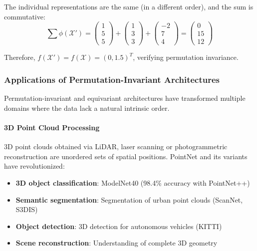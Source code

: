 \begin{example}
The individual representations are the same (in a different order), and the sum is commutative:
\begin{equation}
\sum \phi(\mathcal{X}') = \begin{pmatrix} 1 \\ 5 \\ 5 \end{pmatrix} + \begin{pmatrix} 1 \\ 3 \\ 3 \end{pmatrix} + \begin{pmatrix} -2 \\ 7 \\ 4 \end{pmatrix} = \begin{pmatrix} 0 \\ 15 \\ 12 \end{pmatrix}
\end{equation}

Therefore, $f(\mathcal{X}') = f(\mathcal{X}) = (0, 1.5)^T$, verifying permutation invariance.
\end{example}

\subsubsection{Applications of Permutation-Invariant Architectures}

Permutation-invariant and equivariant architectures have transformed multiple domains where the data lack a natural intrinsic order.

\paragraph{3D Point Cloud Processing}

3D point clouds obtained via LiDAR, laser scanning or photogrammetric reconstruction are unordered sets of spatial positions. PointNet and its variants have revolutionized:

\begin{itemize}
    \item \textbf{3D object classification}: ModelNet40 (98.4\% accuracy with PointNet++)
    \item \textbf{Semantic segmentation}: Segmentation of urban point clouds (ScanNet, S3DIS)
    \item \textbf{Object detection}: 3D detection for autonomous vehicles (KITTI)
    \item \textbf{Scene reconstruction}: Understanding of complete 3D geometry
\end{itemize}

